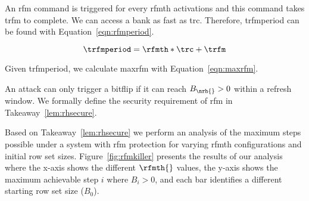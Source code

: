 {An \gls{rfm} command is triggered for every \gls{rfmth} activations and this command takes \gls{trfm} to complete.
We can access a bank as fast as \gls{trc}.
Therefore, \gls{trfmperiod} can be found with Equation~\ref{eqn:rfmperiod}.

\begin{equation}
\label{eqn:rfmperiod}
\trfmperiod = \rfmth * \trc + \trfm
\end{equation}

Given \gls{trfmperiod}, we calculate \gls{maxrfm} with Equation~\ref{eqn:maxrfm}.



An attack can only trigger a bitflip if it can reach $B_{\nrh{}} > 0$ within a refresh window. We formally define the security requirement of \gls{rfm} in Takeaway~\ref{lem:rhsecure}.


Based on Takeaway~\ref{lem:rhsecure} we perform an analysis of the maximum steps possible under a system with \gls{rfm} protection for varying \gls{rfmth} configurations and initial row set sizes. Figure~\ref{fig:rfmkiller} presents the results of our analysis where the x-axis shows the different $\rfmth{}$ values, the y-axis shows the maximum achievable step $i$ where $B_{i} > 0$, and each bar identifies a different starting row set size ($B_{0}$).

}

